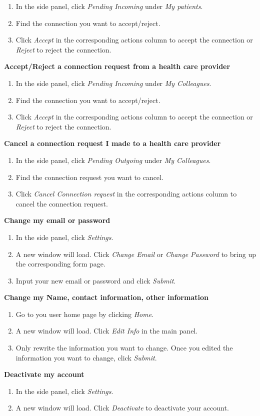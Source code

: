 \documentclass[10pt]{report}
\begin{document}
\begin{enumerate}
\item In the side panel, click \textit{Pending Incoming} under \textit{My patients}.
\item Find the connection you want to accept/reject.
\item Click \textit{Accept} in the corresponding actions column to accept the connection or \textit{Reject} to reject the connection.
\end{enumerate}
\textbf{Accept/Reject a connection request from a health care provider}
\begin{enumerate}
\item In the side panel, click \textit{Pending Incoming} under \textit{My Colleagues}.
\item Find the connection you want to accept/reject.
\item Click \textit{Accept} in the corresponding actions column to accept the connection or \textit{Reject} to reject the connection.
\end{enumerate}
\textbf{Cancel a connection request I made to a health care provider}
\begin{enumerate}
\item In the side panel, click \textit{Pending Outgoing} under \textit{My Colleagues}.
\item Find the connection request you want to cancel.
\item Click \textit{Cancel Connection request} in the corresponding actions column to cancel the connection request.
\end{enumerate}
\textbf{Change my email or password}
\begin{enumerate}
\item In the side panel, click \textit{Settings}.
\item A new window will load. Click \textit{Change Email} or \textit{Change Password} to bring up the corresponding form page.
\item Input your new email or password and click \textit{Submit}.
\end{enumerate}
\textbf{Change my Name, contact information, other information}
\begin{enumerate}
\item Go to you user home page by clicking \textit{Home}.
\item A new window will load. Click \textit{Edit Info} in the main panel.
\item Only rewrite the information you want to change. Once you edited the information you want to change, click \textit{Submit}.
\end{enumerate}
\textbf{Deactivate my account}
\begin{enumerate}
\item In the side panel, click \textit{Settings}.
\item A new window will load. Click \textit{Deactivate} to deactivate your account.
\end{enumerate}
\end{document}
